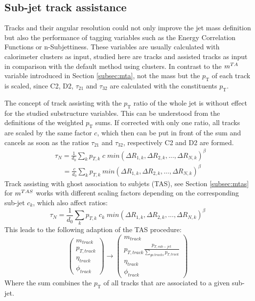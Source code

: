 
\subsection{Sub-jet track assistance}\label{subsec:ta_adapt}
Tracks and their angular resolution could not only improve the jet mass definition but also the performance of tagging variables such as the Energy Correlation Functions or n-Subjettiness. These variables are usually calculated with calorimeter clusters as input, studied here are tracks and assisted tracks as input in comparison with the default method using clusters. 
In contrast to the $m^{TA}$ variable introduced in Section \ref{subsec:mta}, not the mass but the $p_{\mathrm{T}}$ of each track is scaled, since C2, D2, $\tau_{21}$ and $\tau_{32}$ are calculated with the constituents $p_{\mathrm{T}}$.

The concept of track assisting with the $p_{\mathrm{T}}$ ratio of the whole jet is without effect for the studied substructure variables. This can be understood from the definitions of the weighted $p_{\mathrm{T}}$ sums. If corrected with only one ratio, all tracks are scaled by the same factor $c$, which then can be put in front of the sum and cancels as soon as the ratios $\tau_{21}$ and $\tau_{32}$, respectively C2 and D2 are formed.
\begin{equation}
\begin{aligned}
 & \tau_N ={} \frac{1}{d_0}\sum_k p_{T,k} \; c \; min(\Delta R_{1,k},\Delta R_{2,k},...,\Delta R_{N,k})^{\beta} \\
 & \; \; \; \;  ={} \frac{c}{d_0}\sum_k p_{T,k}\:min(\Delta R_{1,k},\Delta R_{2,k},...,\Delta R_{N,k})^{\beta}
\end{aligned}
\end{equation}
Track assisting with ghost association to subjets (TAS), see Section \ref{subsec:mtas} for $m^{TAS}$ works with different scaling factors depending on the corresponding sub-jet $c_k$, which also affect ratios:
\begin{equation}
\tau_N = \frac{1}{d_0}\sum_k p_{T,k} \; c_k \; min(\Delta R_{1,k},\Delta R_{2,k},...,\Delta R_{N,k})^{\beta} 
\end{equation}\label{eq:tas_ta}
This leads to the following adaption of the TAS procedure:
\begin{equation}
\begin{pmatrix}
                    m_{track} \\ p_{T,track} \\ \eta_{track} \\  \phi_{track}
                    \end{pmatrix}       \rightarrow \begin{pmatrix}
                    m_{track}  \\ p_{T,track}  \frac{p_{T,sub-jet}}{\sum\limits_{ga\:tracks}p_{T,track}} \\ \eta_{track} \\ \phi_{track}
            
            \end{pmatrix}  
\end{equation}\label{eq:track_tas}
Where the sum combines the $p_{\mathrm{T}}$ of all tracks that are associated to a given sub-jet. 


